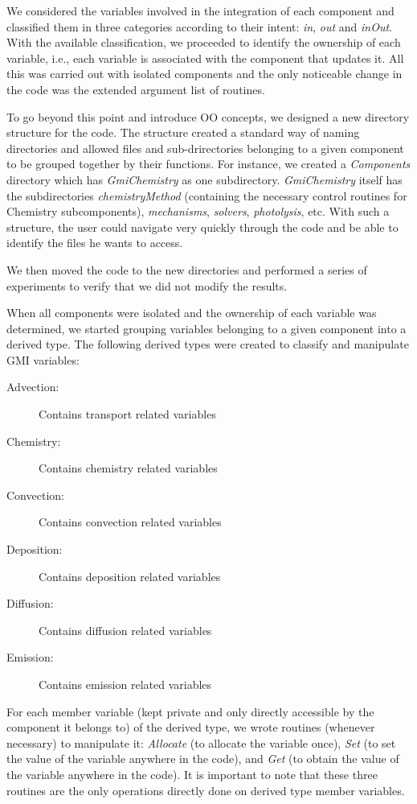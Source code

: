 \documentclass[11pt]{article}
\def\bd{\begin{description}}
\def\ed{\end{description}}
\begin{document}
We considered the variables involved in the integration of each component
and classified them
in three categories according to their intent: {\em in}, {\em out} and {\em inOut}.
With the available classification, we proceeded to identify the ownership of each 
variable, i.e., each variable is associated with the component that updates it.
All this was carried out with isolated components and the only noticeable change 
in the code was the extended argument list of routines.

To go beyond this point and introduce OO concepts, we designed a new directory 
structure for the code. 
The structure created a standard way of naming directories and allowed files and 
sub-drirectories belonging to a given component to be grouped together by their 
functions.
For instance, we created a {\em Components} directory which has 
{\em GmiChemistry} as one subdirectory. {\em GmiChemistry} itself has the 
subdirectories {\em chemistryMethod} (containing the necessary control routines 
for Chemistry subcomponents), {\em mechanisms}, {\em solvers},
{\em photolysis}, etc.
With such a structure, the user could navigate very quickly through the code 
and be able to identify the files he wants to access.

We then moved the code to the new directories and performed a series of experiments
to verify that we did not modify the results.

When all components were isolated and the ownership of each variable was
determined, we started grouping variables belonging to a given component into a 
derived type.
The following derived types were created to classify and manipulate GMI variables:
%
\bd
\item[Advection:] Contains transport related variables
\item[Chemistry:] Contains chemistry related variables
\item[Convection:] Contains convection related variables
\item[Deposition:] Contains deposition related variables
\item[Diffusion:] Contains diffusion related variables
\item[Emission:] Contains emission related variables
\ed
%
For each member variable (kept private and only directly accessible by the 
component it belongs to) of the derived type, we wrote routines (whenever necessary)
to manipulate it: 
{\em Allocate} (to allocate the variable once), 
{\em Set} (to set the value of the variable anywhere in the code), and 
{\em Get} (to obtain the value of the variable anywhere in the code).
It is important to note that these three routines are the only operations directly done
on derived type member variables.
\end{document}
